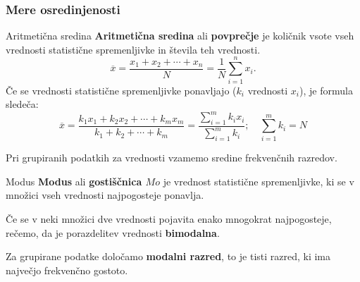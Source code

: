         \begin{frame}
            \frametitle{Mere osredinjenosti}

            \begin{alertblock}{Aritmetična sredina}
                \textbf{Aritmetična sredina} ali \textbf{povprečje} je količnik vsote vseh vrednosti 
                statistične spremenljivke in števila teh vrednosti. \\

                $$\overline{x}=\dfrac{x_1+x_2+\cdots+x_n}{N}=\dfrac{1}{N}\sum_{i=1}^n x_i.$$
                Če se vrednosti statistične spremenljivke ponavljajo ($k_i$ vrednosti $x_i$), je formula sledeča:
                $$\overline{x}=\dfrac{k_1x_1+k_2x_2+\cdots+k_mx_m}{k_1+k_2+\cdots+k_m}=\dfrac{\sum_{i=1}^mk_ix_i}{\sum_{i=1}^mk_i}; \quad \sum_{i=1}^mk_i=N$$
  
            \end{alertblock}   

            \begin{block}{}
                Pri grupiranih podatkih za vrednosti vzamemo sredine frekvenčnih razredov.
            \end{block}

        \end{frame}

        \begin{frame}
            \begin{alertblock}{Modus}
                \textbf{Modus} ali \textbf{gostiščnica $Mo$} je vrednost statistične spremenljivke, ki se v množici vseh vrednosti najpogosteje ponavlja.                 
            \end{alertblock}

            \begin{block}{}
                Če se v neki množici dve vrednosti pojavita enako mnogokrat najpogosteje, rečemo, da je porazdelitev vrednosti \textbf{bimodalna}.
            \end{block}

            \begin{block}{}
                Za grupirane podatke določamo \textbf{modalni razred}, to je tisti razred, ki ima največjo frekvenčno gostoto.
            \end{block}
        \end{frame}

